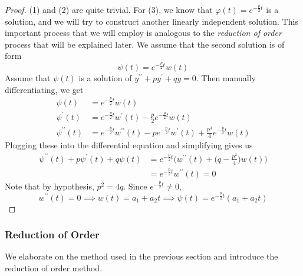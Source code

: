 \documentclass{article}
\begin{document}
      \begin{proof}
      (1) and (2) are quite trivial. For (3), we know that $\varphi(t) = e^{-\frac{p}{2} t}$ is a solution, and we will try to construct another linearly independent solution. This important process that we will employ is analogous to the \textit{reduction of order} process that will be explained later. We assume that the second solution is of form
      \begin{equation}
        \psi (t) = e^{-\frac{p}{2} t} w (t)
      \end{equation}
      Assume that $\psi (t)$ is a solution of $y^{\prime\prime} + p y^\prime + q y = 0$. Then manually differentiating, we get 
      \begin{align*}
          \psi (t) & = e^{-\frac{p}{2}t} w(t) \\
          \psi^\prime (t) & = e^{-\frac{p}{2} t} w^\prime (t) - \frac{p}{2} e^{-\frac{p}{2} t} w(t) \\
          \psi^{\prime\prime} (t) & = e^{-\frac{p}{2} t} w^{\prime \prime} (t) - p e^{-\frac{p}{2} t} w^\prime (t) + \frac{p^3}{4} e^{-\frac{p}{2} t} w(t) 
      \end{align*}
      Plugging these into the differential equation and simplifying gives us
      \begin{align*}
          \psi^{\prime\prime} (t) + p \psi^\prime (t) + q \psi (t) & = e^{-\frac{p}{2} t} \bigg( w^{\prime\prime} (t) + \Big( q - \frac{p^2}{4} \Big) w(t) \bigg) \\
          & = e^{-\frac{p}{2} t} w^{\prime\prime} (t) = 0
      \end{align*}
      Note that by hypothesis, $p^2 = 4q$. Since $e^{-\frac{p}{2} t} \neq 0$, 
      \begin{equation}
        w^{\prime\prime} (t) = 0 \implies w (t) = a_1 + a_2 t \implies \psi(t) = e^{-\frac{p}{2} t} (a_1 + a_2 t)
      \end{equation}
      \end{proof}

    \subsubsection{Reduction of Order}

      We elaborate on the method used in the previous section and introduce the reduction of order method. 
\end{document}
